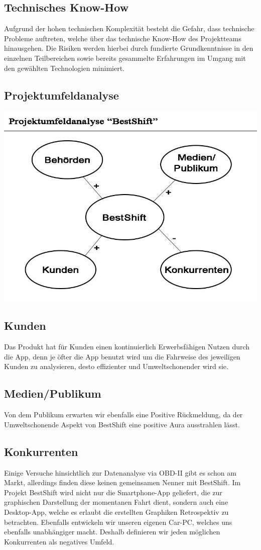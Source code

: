  \subsection{Technisches Know-How}
 Aufgrund der hohen technischen Komplexität besteht die Gefahr, 
 dass technische Probleme auftreten, welche über das technische Know-How des Projektteams 
 hinausgehen. Die Risiken werden hierbei durch fundierte Grundkenntnisse in den einzelnen Teilbereichen 
 sowie bereits gesammelte Erfahrungen im Umgang mit den gewählten Technologien minimiert. 
 \subsection{Projektumfeldanalyse}
 \includegraphics[scale=0.5]{images/Puma.jpg}

 \subsection{Kunden}
 Das Produkt hat für Kunden einen kontinuierlich Erwerbsfähigen Nutzen durch die App,
 denn je öfter die App benutzt wird um die Fahrweise des jeweiligen Kunden zu analysieren,
 desto effizienter und Umweltschonender wird sie. 
 \subsection{Medien/Publikum}
 Von dem Publikum erwarten wir ebenfalls eine Positive Rückmeldung,
 da der Umweltschonende Aspekt von BestShift eine positive Aura ausstrahlen lässt.
 \subsection{Konkurrenten}
 Einige Versuche hinsichtlich zur Datenanalyse via OBD-II gibt es schon am Markt,
 allerdings finden diese keinen gemeinsamen Nenner mit BestShift.
 Im Projekt BestShift wird nicht nur die Smartphone-App geliefert, die zur graphischen Darstellung der momentanen
 Fahrt dient, sondern auch eine Desktop-App, welche es erlaubt die erstellten Graphiken Retrospektiv zu betrachten.
 Ebenfalls entwickeln wir unseren eigenen Car-PC, welches uns ebenfalls unabhängiger macht.
 Deshalb definieren wir jeden möglichen Konkurrenten als negatives Umfeld.
 
